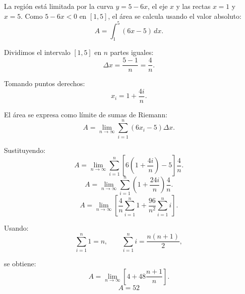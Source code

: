 \nopagebreak

La región está limitada por la curva \(y=5-6x\), el eje \(x\) y las rectas
\(x=1\) y \(x=5\).  
Como \(5-6x<0\) en \([1,5]\), el área se calcula usando el valor absoluto:
\[
A=\int_{1}^{5}(6x-5)\,dx.
\]

Dividimos el intervalo \([1,5]\) en \(n\) partes iguales:
\[
\Delta x=\frac{5-1}{n}=\frac{4}{n}.
\]

Tomando puntos derechos:
\[
x_i = 1 + \frac{4i}{n}.
\]

El área se expresa como límite de sumas de Riemann:
\[
A=\lim_{n\to\infty}\sum_{i=1}^{n}(6x_i-5)\Delta x.
\]

Sustituyendo:
\[
A=\lim_{n\to\infty}\sum_{i=1}^{n}
\left[6\left(1+\frac{4i}{n}\right)-5\right]\frac{4}{n}.
\]
\[
A=\lim_{n\to\infty}\sum_{i=1}^{n}
\left(1+\frac{24i}{n}\right)\frac{4}{n}.
\]
\[
A=\lim_{n\to\infty}
\left[
\frac{4}{n}\sum_{i=1}^{n}1
+
\frac{96}{n^2}\sum_{i=1}^{n}i
\right].
\]

Usando:
\[
\sum_{i=1}^{n}1=n,
\qquad
\sum_{i=1}^{n}i=\frac{n(n+1)}{2},
\]

se obtiene:
\[
A=\lim_{n\to\infty}
\left[
4 + 48\frac{n+1}{n}
\right].
\]
\[
\boxed{A=52}
\]
